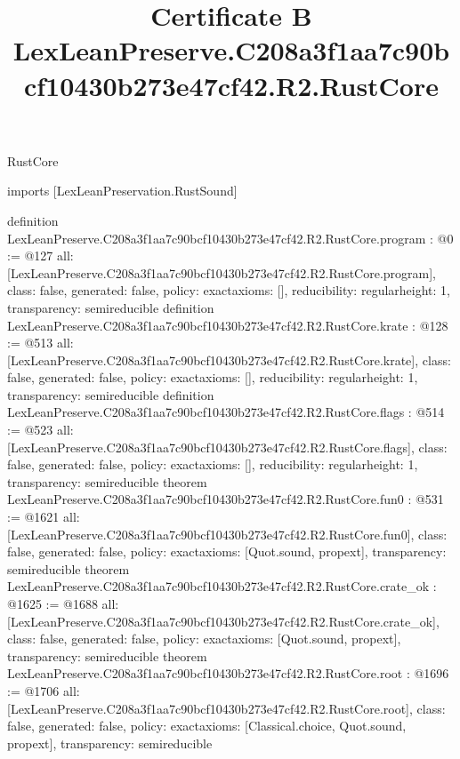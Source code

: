 \begin{lexlean}{RustCore}
\title{Certificate B LexLeanPreserve.C208a3f1aa7c90bcf10430b273e47cf42.R2.RustCore}
\begin{coremodule}
imports [LexLeanPreservation.RustSound]

definition LexLeanPreserve.C208a3f1aa7c90bcf10430b273e47cf42.R2.RustCore.program : @0 := @127 {
  all: [LexLeanPreserve.C208a3f1aa7c90bcf10430b273e47cf42.R2.RustCore.program],
  class: false,
  generated: false,
  policy: exact{axioms: []},
  reducibility: regular{height: 1},
  transparency: semireducible
}
definition LexLeanPreserve.C208a3f1aa7c90bcf10430b273e47cf42.R2.RustCore.krate : @128 := @513 {
  all: [LexLeanPreserve.C208a3f1aa7c90bcf10430b273e47cf42.R2.RustCore.krate],
  class: false,
  generated: false,
  policy: exact{axioms: []},
  reducibility: regular{height: 1},
  transparency: semireducible
}
definition LexLeanPreserve.C208a3f1aa7c90bcf10430b273e47cf42.R2.RustCore.flags : @514 := @523 {
  all: [LexLeanPreserve.C208a3f1aa7c90bcf10430b273e47cf42.R2.RustCore.flags],
  class: false,
  generated: false,
  policy: exact{axioms: []},
  reducibility: regular{height: 1},
  transparency: semireducible
}
theorem LexLeanPreserve.C208a3f1aa7c90bcf10430b273e47cf42.R2.RustCore.fun0 : @531 := @1621 {
  all: [LexLeanPreserve.C208a3f1aa7c90bcf10430b273e47cf42.R2.RustCore.fun0],
  class: false,
  generated: false,
  policy: exact{axioms: [Quot.sound, propext]},
  transparency: semireducible
}
theorem LexLeanPreserve.C208a3f1aa7c90bcf10430b273e47cf42.R2.RustCore.crate_ok : @1625 := @1688 {
  all: [LexLeanPreserve.C208a3f1aa7c90bcf10430b273e47cf42.R2.RustCore.crate_ok],
  class: false,
  generated: false,
  policy: exact{axioms: [Quot.sound, propext]},
  transparency: semireducible
}
theorem LexLeanPreserve.C208a3f1aa7c90bcf10430b273e47cf42.R2.RustCore.root : @1696 := @1706 {
  all: [LexLeanPreserve.C208a3f1aa7c90bcf10430b273e47cf42.R2.RustCore.root],
  class: false,
  generated: false,
  policy: exact{axioms: [Classical.choice, Quot.sound, propext]},
  transparency: semireducible
}


\end{coremodule}
\end{lexlean}
